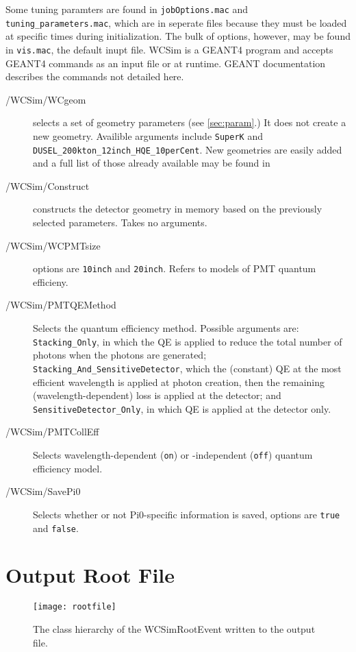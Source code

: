 Some tuning paramters are found in \texttt{jobOptions.mac} and \texttt{tuning\_parameters.mac}, which are in seperate files because they must be loaded at specific times during initialization.  The bulk of options, however, may be found in \texttt{vis.mac}, the default inupt file.  WCSim is a GEANT4 program  and accepts GEANT4 commands as an input file or at runtime.  GEANT documentation describes the commands not detailed here.
\begin{description}
\item[/WCSim/WCgeom] selects a set of geometry parameters (see \ref{sec:param}.)  It does not create a new geometry.  Availible arguments include \texttt{SuperK} and \texttt{DUSEL\_200kton\_12inch\_HQE\_10perCent}.  New geometries are easily added and a full list of those already available may be found in 
\item[/WCSim/Construct] constructs the detector geometry in memory based on the previously selected parameters.  Takes no arguments.
\item[/WCSim/WCPMTsize] options are \texttt{10inch} and \texttt{20inch}.  Refers to models of PMT quantum efficieny.
\item[/WCSim/PMTQEMethod] Selects the quantum efficiency method. Possible arguments are: \texttt{Stacking\_Only}, in which the QE is applied to reduce the total number of photons when the photons are generated; \texttt{Stacking\_And\_SensitiveDetector}, which the (constant) QE at the most efficient wavelength is applied at photon creation, then the remaining (wavelength-dependent) loss is applied at the detector; and \texttt{SensitiveDetector\_Only}, in which QE is applied at the detector only.
\item[/WCSim/PMTCollEff] Selects wavelength-dependent (\texttt{on}) or -independent (\texttt{off}) quantum efficiency model.
\item[/WCSim/SavePi0] Selects whether or not Pi0-specific information is saved, options are \texttt{true} and \texttt{false}.

\end{description}



\section{Output Root File}

\begin{figure}[t!]
  \begin{center}
\texttt{[image: rootfile]}
  \end{center}
\caption{The class hierarchy of the WCSimRootEvent written to the output file.} \label{fig:rootfile}
\end{figure}

